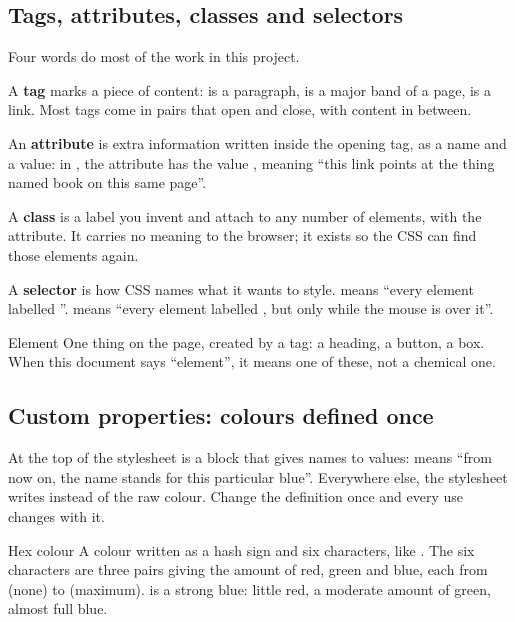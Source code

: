 \documentclass[11pt,a4paper]{article}
\begin{document}
\subsection{Tags, attributes, classes and selectors}

Four words do most of the work in this project.

A \textbf{tag} marks a piece of content:  is a paragraph,
 is a major band of a page,  is a link. Most tags come
in pairs that open and close, with content in between.

An \textbf{attribute} is extra information written inside the opening tag, as a
name and a value: in , the attribute  has the
value , meaning ``this link points at the thing named book on this
same page''.

A \textbf{class} is a label you invent and attach to any number of elements, with
the  attribute. It carries no meaning to the browser; it exists so
the CSS can find those elements again.

A \textbf{selector} is how CSS names what it wants to style.  means
``every element labelled ''.  means ``every
element labelled , but only while the mouse is over it''.

\begin{jargon}{Element}
One thing on the page, created by a tag: a heading, a button, a box. When this
document says ``element'', it means one of these, not a chemical one.
\end{jargon}

\subsection{Custom properties: colours defined once}

At the top of the stylesheet is a block that gives names to values:
 means ``from now on, the name  stands
for this particular blue''. Everywhere else, the stylesheet writes
 instead of the raw colour. Change the definition once and
every use changes with it.

\begin{jargon}{Hex colour}
A colour written as a hash sign and six characters, like . The six
characters are three pairs giving the amount of red, green and blue, each from
 (none) to  (maximum).  is a strong blue:
little red, a moderate amount of green, almost full blue.
\end{jargon}
\end{document}
